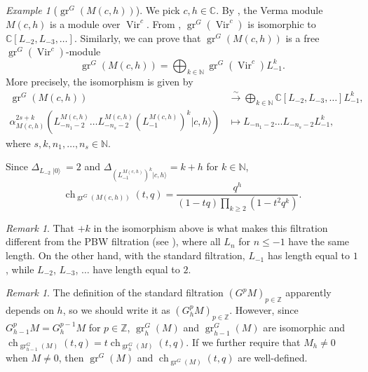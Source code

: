 \documentclass[a4paper, 12pt, reqno]{amsart}
\theoremstyle{remark}
\newtheorem{remark}[theorem]{Remark}
\newtheorem{example}[theorem]{Example}
\DeclareMathOperator{\Vir}{Vir}
\DeclareMathOperator{\gr}{gr}
\DeclareMathOperator{\ch}{ch}
\DeclareMathOperator{\vac}{|0\rangle}
\begin{document}
\begin{example}[$\gr^G(M(c, h))$]
  \label{exa:15}
  We pick $c, h \in \mathbb{C}$.
  By , the Verma module $M(c, h)$ is a module over $\Vir^c$.
  From , $\gr^G(\Vir^c)$ is isomorphic to $\mathbb{C}[L_{-2}, L_{-3}, \dots]$.
  Similarly, we can prove that $\gr^G(M(c, h))$ is a free $\gr^G(\Vir^c)$-module
  \begin{equation*}
    \gr^G(M(c, h)) = \bigoplus_{k \in \mathbb{N}}\gr^G(\Vir^c)L_{-1}^k.
  \end{equation*}
  More precisely, the isomorphism is given by
  \begin{align*}
    \gr^G(M(c, h)) &\xrightarrow{\sim} \bigoplus_{k \in \mathbb{N}}\mathbb{C}[L_{-2}, L_{-3}, \dots]L_{-1}^k, \\
    \alpha_{M(c, h)}^{2s + k}(L_{-n_1 - 2}^{M(c, h)}\dots L_{-n_s - 2}^{M(c, h)}(L_{-1}^{M(c, h)})^k|c, h\rangle) &\mapsto L_{-n_1 - 2}\dots L_{-n_s - 2}L_{-1}^k,
  \end{align*}
  where $s, k, n_1, \dots, n_s \in \mathbb{N}$.

  Since $\Delta_{L_{-2}\vac} = 2$ and $\Delta_{(L_{-1}^{M(c, h)})^k|c, h\rangle} = k + h$ for $k \in \mathbb{N}$,
  \begin{equation*}
    \ch_{\gr^G(M(c, h))}(t, q) = \frac{q^h}{(1 - tq)\prod_{k \ge 2}(1 - t^2q^k)}.
  \end{equation*}
\end{example}

\begin{remark}
  \label{rmk:42}
  That $+k$ in the isomorphism above is what makes this filtration different from the PBW filtration (see ), where all $L_n$ for $n \le -1$ have the same length.
  On the other hand, with the standard filtration, $L_{-1}$ has length equal to $1$, while $L_{-2}$, $L_{-3}$, $\dots$ have length equal to $2$.
\end{remark}

\begin{remark}
  \label{rmk:43}
  The definition of the standard filtration $(G^pM)_{p \in \mathbb{Z}}$ apparently depends on $h$, so we should write it as $(G^p_hM)_{p \in \mathbb{Z}}$.
  However, since $G^p_{h - 1}M = G^{p - 1}_hM$ for $p \in \mathbb{Z}$, $\gr^G_h(M)$ and $\gr^G_{h - 1}(M)$ are isomorphic and $\ch_{\gr^G_{h - 1}(M)}(t, q) = t\ch_{\gr^G_h(M)}(t, q)$.
  If we further require that $M_h \neq 0$ when $M \neq 0$, then $\gr^G(M)$ and $\ch_{\gr^G(M)}(t, q)$ are well-defined.
\end{remark}
\end{document}
